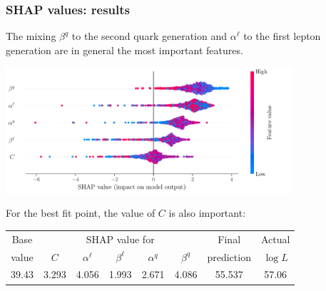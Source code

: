 \documentclass[mathserif, 10pt]{beamer}
\begin{document}
\begin{frame}
    \frametitle{SHAP values: results}

    The mixing \(\beta^q\) to the second quark generation and $\alpha^\ell$ to the first lepton generation are in general the most important features.
    \begin{center}
        \includegraphics[width=0.8\textwidth]{figures/SHAP_summary.pdf}
    \end{center}
    
    For the best fit point, the value of $C$ is also important:
    \begin{center}
        \begin{tabular}{|*{8}{c|}}\hline
        Base & \multicolumn{5}{c|}{SHAP value for} & Final & Actual \\ \cline{2-6}
        value & $C$ & $\alpha^\ell$ & $\beta^\ell$ & $\alpha^q$ & $\beta^q$ & prediction & $\log L$ \\\hline
        39.43 & 3.293 & 4.056 & 1.993 & 2.671 & 4.086 & 55.537 & 57.06 \\\hline
        \end{tabular}
        \end{center}

\end{frame}
\end{document}
